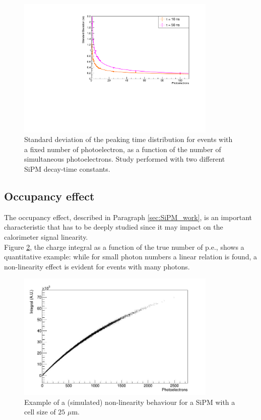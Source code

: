 \begin{figure}
	\centering
	\includegraphics[width=0.85\textwidth]{IMG/Cap5/PeakSpread}
	\caption{Standard deviation of the peaking time distribution for events with a fixed number of photoelectron, as a function of the number of simultaneous photoelectrons. Study performed with two different SiPM decay-time constants.}
	\label{fig:top_sigma}
\end{figure}


\subsection{Occupancy effect} \label{subsec:Sat_effect}
The occupancy effect, described in Paragraph \ref{sec:SiPM_work}, is an important characteristic that has to be deeply studied since it may impact on the calorimeter signal linearity.\\

Figure \ref{fig:sat_example}, the charge integral as a function of the true number of p.e., shows a quantitative example:  while for small photon numbers a linear relation is found, a non-linearity effect is evident for events with many photons.\\

\begin{figure}
	\centering
	\includegraphics[width=0.85\textwidth]{IMG/Cap5/SatExample.jpg}
	\caption{Example of a (simulated) non-linearity behaviour for a SiPM with a cell size of $25$ $\mu$m.}
	\label{fig:sat_example}
\end{figure}


